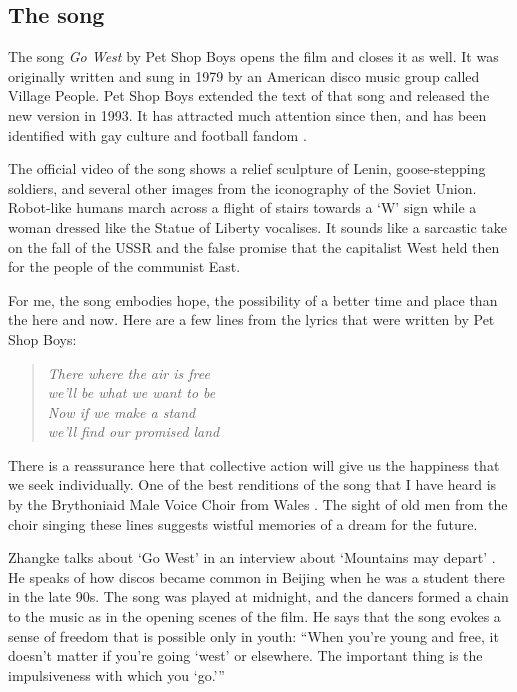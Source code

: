 \documentclass{article}
\begin{document}
\subsection{The song}
\label{sec:njpsvlf6}

The song \emph{Go West} by Pet Shop Boys opens the film and closes it
as well.  It was originally written and sung in 1979 by an American
disco music group called Village People.  Pet Shop Boys extended the
text of that song and released the new version in 1993.  It has
attracted much attention since then, and has been identified with gay
culture and football fandom \parencite{bib:3hf0kuo0}.

The official video of the song \parencite{bib:4dsv5d40} shows a relief
sculpture of Lenin, goose-stepping soldiers, and several other images
from the iconography of the Soviet Union.  Robot-like humans march
across a flight of stairs towards a `W' sign while a woman dressed
like the Statue of Liberty vocalises.  It sounds like a sarcastic take
on the fall of the USSR and the false promise that the capitalist West
held then for the people of the communist East.

For me, the song embodies hope, the possibility of a better time and
place than the here and now.  Here are a few lines from the lyrics
that were written by Pet Shop Boys:
\begin{verse} \itshape
  There where the air is free \\
  we'll be what we want to be \\
  Now if we make a stand \\
  we'll find our promised land
\end{verse}
There is a reassurance here that collective action will give us the
happiness that we seek individually.  One of the best renditions of
the song that I have heard is by the Brythoniaid Male Voice Choir from
Wales \parencite{bib:4lizl8c7}.  The sight of old men from the choir
singing these lines \parencite{bib:n7kfye4j} suggests wistful memories
of a dream for the future.

Zhangke talks about `Go West' in an interview about `Mountains may
depart' \parencite{bib:zt0dmft0}.  He speaks of how discos became
common in Beijing when he was a student there in the late 90s.  The
song was played at midnight, and the dancers formed a chain to the
music as in the opening scenes of the film.  He says that the song
evokes a sense of freedom that is possible only in youth: ``When
you're young and free, it doesn’t matter if you're going `west' or
elsewhere.  The important thing is the impulsiveness with which you
{`go.'}''
\end{document}
